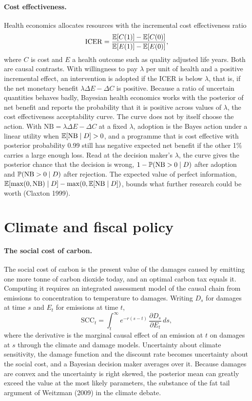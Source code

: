 \paragraph{Cost effectiveness.} Health economics allocates resources with the incremental cost effectiveness ratio
\[
\mathrm{ICER} = \frac{\mathbb{E}[C(1)] - \mathbb{E}[C(0)]}{\mathbb{E}[E(1)] - \mathbb{E}[E(0)]},
\]
where $C$ is cost and $E$ a health outcome such as quality adjusted life years. Both are causal contrasts. With willingness to pay $\lambda$ per unit of health and a positive incremental effect, an intervention is adopted if the ICER is below $\lambda$, that is, if the net monetary benefit $\lambda\Delta E - \Delta C$ is positive. Because a ratio of uncertain quantities behaves badly, Bayesian health economics works with the posterior of net benefit and reports the probability that it is positive across values of $\lambda$, the cost effectiveness acceptability curve. The curve does not by itself choose the action. With $\mathrm{NB}=\lambda\Delta E-\Delta C$ at a fixed $\lambda$, adoption is the Bayes action under a linear utility when $\mathbb{E}[\mathrm{NB}\mid D]>0$, and a programme that is cost effective with posterior probability 0.99 still has negative expected net benefit if the other 1\% carries a large enough loss. Read at the decision maker's $\lambda$, the curve gives the posterior chance that the decision is wrong, $1-\mathbb{P}(\mathrm{NB}>0\mid D)$ after adoption and $\mathbb{P}(\mathrm{NB}>0\mid D)$ after rejection. The expected value of perfect information, $\mathbb{E}[\max(0,\mathrm{NB})\mid D]-\max(0,\mathbb{E}[\mathrm{NB}\mid D])$, bounds what further research could be worth (Claxton 1999).

\section{Climate and fiscal policy}\label{cdt:sec:macro}

\paragraph{The social cost of carbon.} The social cost of carbon is the present value of the damages caused by emitting one more tonne of carbon dioxide today, and an optimal carbon tax equals it. Computing it requires an integrated assessment model of the causal chain from emissions to concentration to temperature to damages. Writing $D_s$ for damages at time $s$ and $E_t$ for emissions at time $t$,
\[
\mathrm{SCC}_t = \int_t^\infty e^{-r(s-t)}\, \frac{\partial D_s}{\partial E_t}\, ds ,
\]
where the derivative is the marginal causal effect of an emission at $t$ on damages at $s$ through the climate and damage models. Uncertainty about climate sensitivity, the damage function and the discount rate becomes uncertainty about the social cost, and a Bayesian decision maker averages over it. Because damages are convex and the uncertainty is right skewed, the posterior mean can greatly exceed the value at the most likely parameters, the substance of the fat tail argument of Weitzman (2009) in the climate debate.

